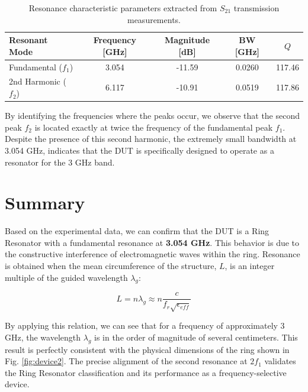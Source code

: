 \begin{table}[h]
    \centering
    \renewcommand{\arraystretch}{1.5} 
    \begin{tabular}{|l|c|c|c|c|}
        \hline
        \textbf{Resonant Mode} & \textbf{Frequency [GHz]} & \textbf{Magnitude [dB]} & \textbf{BW [GHz]} & \textbf{$Q$} \\ \hline
        Fundamental ($f_1$)    & 3.054                    & -11.59                  & 0.0260            & 117.46       \\ \hline
        2nd Harmonic ($f_2$)   & 6.117                    & -10.91                  & 0.0519            & 117.86       \\ \hline
    \end{tabular}
    \caption{Resonance characteristic parameters extracted from $S_{21}$ transmission measurements.}
    \label{tab:resonance_results}
\end{table}

By identifying the frequencies where the peaks occur, we observe that the second peak $f_2$ is located exactly at twice the frequency of the fundamental peak $f_1$. Despite the presence of this second harmonic, the extremely small bandwidth at 3.054 GHz, indicates that the DUT is specifically designed to operate as a resonator for the 3 GHz band.

\section{Summary}
Based on the experimental data, we can confirm that the DUT is a Ring Resonator with a fundamental resonance at \textbf{3.054 GHz}. This behavior is due to the constructive interference of electromagnetic waves within the ring. Resonance is obtained when the mean circumference of the structure, $L$, is an integer multiple of the guided wavelength $\lambda_g$:

\begin{equation}
L = n \lambda_g \approx n \frac{c}{f_r \sqrt{\epsilon_{eff}}}
\end{equation}

By applying this relation, we can see that for a frequency of approximately 3 GHz, the wavelength $\lambda_g$ is in the order of magnitude of several centimeters. This result is perfectly consistent with the physical dimensions of the ring shown in Fig. \ref{fig:device2}. The precise alignment of the second resonance at $2f_1$ validates the Ring Resonator classification and its performance as a frequency-selective device.
